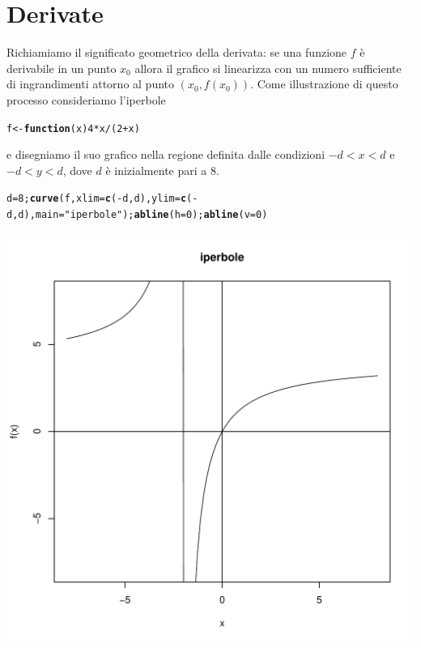 \documentclass[onecolumn,11pt]{book}\usepackage[]{graphicx}\usepackage[]{color}
\makeatletter
\def\maxwidth{ %
  \ifdim\Gin@nat@width>\linewidth
    \linewidth
  \else
    \Gin@nat@width
  \fi
}
\newcommand{\hlnum}[1]{\textcolor[rgb]{0.686,0.059,0.569}{#1}}%
\newcommand{\hlstr}[1]{\textcolor[rgb]{0.192,0.494,0.8}{#1}}%
\newcommand{\hlopt}[1]{\textcolor[rgb]{0,0,0}{#1}}%
\newcommand{\hlstd}[1]{\textcolor[rgb]{0.345,0.345,0.345}{#1}}%
\newcommand{\hlkwa}[1]{\textcolor[rgb]{0.161,0.373,0.58}{\textbf{#1}}}%
\newcommand{\hlkwb}[1]{\textcolor[rgb]{0.69,0.353,0.396}{#1}}%
\newcommand{\hlkwc}[1]{\textcolor[rgb]{0.333,0.667,0.333}{#1}}%
\newcommand{\hlkwd}[1]{\textcolor[rgb]{0.737,0.353,0.396}{\textbf{#1}}}%
\newenvironment{kframe}{%
 \def\at@end@of@kframe{}%
 \ifinner\ifhmode%
  \def\at@end@of@kframe{\end{minipage}}%
  \begin{minipage}{\columnwidth}%
 \fi\fi%
 \def\FrameCommand##1{\hskip\@totalleftmargin \hskip-\fboxsep
 \colorbox{shadecolor}{##1}\hskip-\fboxsep
     \hskip-\linewidth \hskip-\@totalleftmargin \hskip\columnwidth}%
 \MakeFramed {\advance\hsize-\width
   \@totalleftmargin\z@ \linewidth\hsize
   \@setminipage}}%
 {\par\unskip\endMakeFramed%
 \at@end@of@kframe}
\newenvironment{knitrout}{}{} %
\makeatother
\begin{document}
\section{Derivate}
Richiamiamo il significato geometrico della derivata: se una funzione $f$ \`e derivabile in un punto $x_0$ allora il grafico si linearizza con un numero sufficiente di ingrandimenti attorno al punto $(x_0,f(x_0))$.
Come illustrazione di questo processo consideriamo l'iperbole
\begin{knitrout}
\color{fgcolor}\begin{kframe}
\begin{alltt}
\hlstd{f}\hlkwb{<-}\hlkwa{function}\hlstd{(}\hlkwc{x}\hlstd{)} \hlnum{4}\hlopt{*}\hlstd{x}\hlopt{/}\hlstd{(}\hlnum{2}\hlopt{+}\hlstd{x)}
\end{alltt}
\end{kframe}
\end{knitrout}
e disegniamo il suo grafico nella regione definita dalle condizioni $-d<x<d$ e $-d<y<d$, dove $d$ \`e inizialmente pari a 8.
\begin{knitrout}
\color{fgcolor}\begin{kframe}
\begin{alltt}
\hlstd{d}\hlkwb{=}\hlnum{8}\hlstd{;}\hlkwd{curve}\hlstd{(f,}\hlkwc{xlim}\hlstd{=}\hlkwd{c}\hlstd{(}\hlopt{-}\hlstd{d,d),}\hlkwc{ylim}\hlstd{=}\hlkwd{c}\hlstd{(}\hlopt{-}\hlstd{d,d),} \hlkwc{main}\hlstd{=}\hlstr{"iperbole"}\hlstd{);} \hlkwd{abline}\hlstd{(}\hlkwc{h}\hlstd{=}\hlnum{0}\hlstd{);}\hlkwd{abline}\hlstd{(}\hlkwc{v}\hlstd{=}\hlnum{0}\hlstd{)}
\end{alltt}
\end{kframe}
\includegraphics[width=\maxwidth]{figure/unnamed-chunk-108-1} 

\end{knitrout}
\end{document}
